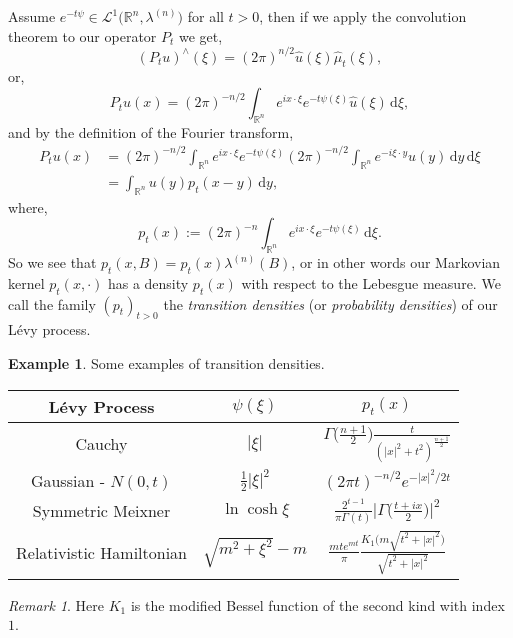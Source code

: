 \documentclass[a4paper, 12pt]{report}
\theoremstyle{cor}
\theoremstyle{remark}
\newtheorem{remark}[theorem]{Remark}
\theoremstyle{definition}
\newtheorem{eg}[theorem]{Example}
\begin{document}
Assume $e^{-t\psi} \in \mathcal{L}^1\big(\mathbb{R}^n, \lambda^{(n)}\big)$ for all $t > 0$, then if we apply the convolution theorem to our operator $P_t$ we get,
$$
(P_tu)^\wedge(\xi) = (2\pi)^{n/2}\hat{u}(\xi)\hat{\mu}_t(\xi),
$$
or,
$$
P_tu(x) = (2\pi)^{-n/2}\int_{\mathbb{R}^n}e^{ix\cdot\xi}e^{-t\psi(\xi)}\hat{u}(\xi)\,\mathrm{d}\xi,
$$
and by the definition of the Fourier transform,
$$
\begin{aligned}
P_tu(x) & = (2\pi)^{-n/2}\int_{\mathbb{R}^n}e^{ix\cdot\xi}e^{-t\psi(\xi)}(2\pi)^{-n/2}\int_{\mathbb{R}^n}e^{-i\xi\cdot y}u(y)\,\mathrm{d}y\,\mathrm{d}\xi\\
& = \int_{\mathbb{R}^n}u(y)p_t(x - y)\,\mathrm{d}y,
\end{aligned}
$$
where,
\begin{equation}\label{TDfLP}
p_t(x) := (2\pi)^{-n}\int_{\mathbb{R}^n}e^{ix\cdot\xi}e^{-t\psi(\xi)}\,\mathrm{d}\xi.
\end{equation}
So we see that $p_t(x, B) = p_t(x)\lambda^{(n)}(B)$, or in other words our Markovian kernel $p_t(x, \cdot)$ has a density $p_t(x)$ with respect to the Lebesgue measure.  We call the family $(p_t)_{t > 0}$ the \emph{transition densities} (or \emph{probability densities}) of our L\'evy process.

\begin{eg}
Some examples of transition densities.
\begin{center}
\begin{tabular}{c | c | c}
L\'evy Process & $\psi(\xi)$ & $p_t(x)$\\
\hline
Cauchy & $|\xi|$ & $\Gamma\big(\frac{n + 1}{2}\big)\frac{t}{(|x|^2 + t^2)^\frac{n + 1}{2}}$\\
Gaussian - $N(0, t)$ & $\frac{1}{2}|\xi|^2$ & $(2\pi t)^{-n/2}e^{-|x|^2/2t}$\\
Symmetric Meixner & $\ln\cosh\xi$ & $\frac{2^{t - 1}}{\pi\Gamma(t)}\big|\Gamma\big(\frac{t + ix}{2}\big)\big|^2$\\
Relativistic Hamiltonian & $\sqrt{m^2 + \xi^2} - m$ & $\frac{mte^{mt}}{\pi}\frac{K_1\big(m\sqrt{t^2 + |x|^2}\big)}{\sqrt{t^2 + |x|^2}}$
\end{tabular}
\end{center}

\end{eg}
\begin{remark}
Here $K_1$ is the modified Bessel function of the second kind with index $1$.
\end{remark}
\end{document}
